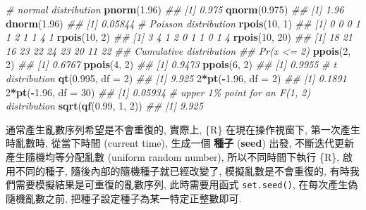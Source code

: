 \documentclass[
]{book}
\newenvironment{Shaded}{\begin{snugshade}}{\end{snugshade}}
\newcommand{\CommentTok}[1]{\textcolor[rgb]{0.56,0.35,0.01}{\textit{#1}}}
\newcommand{\DataTypeTok}[1]{\textcolor[rgb]{0.13,0.29,0.53}{#1}}
\newcommand{\DecValTok}[1]{\textcolor[rgb]{0.00,0.00,0.81}{#1}}
\newcommand{\FloatTok}[1]{\textcolor[rgb]{0.00,0.00,0.81}{#1}}
\newcommand{\KeywordTok}[1]{\textcolor[rgb]{0.13,0.29,0.53}{\textbf{#1}}}
\newcommand{\NormalTok}[1]{#1}
\newcommand{\OperatorTok}[1]{\textcolor[rgb]{0.81,0.36,0.00}{\textbf{#1}}}
\begin{document}
\begin{Shaded}
\begin{Highlighting}[]
\CommentTok{\# normal distribution}
\KeywordTok{pnorm}\NormalTok{(}\FloatTok{1.96}\NormalTok{)}
\CommentTok{\#\# [1] 0.975}
\KeywordTok{qnorm}\NormalTok{(}\FloatTok{0.975}\NormalTok{)}
\CommentTok{\#\# [1] 1.96}
\KeywordTok{dnorm}\NormalTok{(}\FloatTok{1.96}\NormalTok{)}
\CommentTok{\#\# [1] 0.05844}
\CommentTok{\# Poisson distribution}
\KeywordTok{rpois}\NormalTok{(}\DecValTok{10}\NormalTok{, }\DecValTok{1}\NormalTok{)}
\CommentTok{\#\#  [1] 0 0 0 1 1 2 1 1 4 1}
\KeywordTok{rpois}\NormalTok{(}\DecValTok{10}\NormalTok{, }\DecValTok{2}\NormalTok{)}
\CommentTok{\#\#  [1] 3 4 1 2 0 1 1 0 1 4}
\KeywordTok{rpois}\NormalTok{(}\DecValTok{10}\NormalTok{, }\DecValTok{20}\NormalTok{)}
\CommentTok{\#\#  [1] 18 21 16 23 22 24 23 20 11 22}
\CommentTok{\#\# Cumulative distribution}
\CommentTok{\#\# Pr(x \textless{}= 2)}
\KeywordTok{ppois}\NormalTok{(}\DecValTok{2}\NormalTok{, }\DecValTok{2}\NormalTok{)}
\CommentTok{\#\# [1] 0.6767}
\KeywordTok{ppois}\NormalTok{(}\DecValTok{4}\NormalTok{, }\DecValTok{2}\NormalTok{)}
\CommentTok{\#\# [1] 0.9473}
\KeywordTok{ppois}\NormalTok{(}\DecValTok{6}\NormalTok{, }\DecValTok{2}\NormalTok{)}
\CommentTok{\#\# [1] 0.9955}
\CommentTok{\# t distribution}
\KeywordTok{qt}\NormalTok{(}\FloatTok{0.995}\NormalTok{, }\DataTypeTok{df =} \DecValTok{2}\NormalTok{)}
\CommentTok{\#\# [1] 9.925}
\DecValTok{2}\OperatorTok{*}\KeywordTok{pt}\NormalTok{(}\OperatorTok{{-}}\FloatTok{1.96}\NormalTok{, }\DataTypeTok{df =} \DecValTok{2}\NormalTok{)}
\CommentTok{\#\# [1] 0.1891}
\DecValTok{2}\OperatorTok{*}\KeywordTok{pt}\NormalTok{(}\OperatorTok{{-}}\FloatTok{1.96}\NormalTok{, }\DataTypeTok{df =} \DecValTok{30}\NormalTok{)}
\CommentTok{\#\# [1] 0.05934}
\CommentTok{\# upper 1\% point for an F(1, 2) distribution}
\KeywordTok{sqrt}\NormalTok{(}\KeywordTok{qf}\NormalTok{(}\FloatTok{0.99}\NormalTok{, }\DecValTok{1}\NormalTok{, }\DecValTok{2}\NormalTok{))}
\CommentTok{\#\# [1] 9.925}
\end{Highlighting}
\end{Shaded}

通常產生亂數序列希望是不會重復的,
實際上, \{R\} 在現在操作視窗下, 第一次產生時亂數時,
從當下時間 (current time), 生成一個
\textbf{種子}
(\textbf{seed})
出發,
不斷迭代更新產生隨機均等分配亂數 (uniform random number),
所以不同時間下執行 \{R\}, 啟用不同的種子, 隨後內部的隨機種子就已經改變了, 模擬亂數是不會重復的,
有時我們需要模擬結果是可重復的亂數序列,
此時需要用函式 \texttt{set.seed()},
在每次產生偽隨機亂數之前, 把種子設定種子為某一特定正整數即可.
\end{document}

